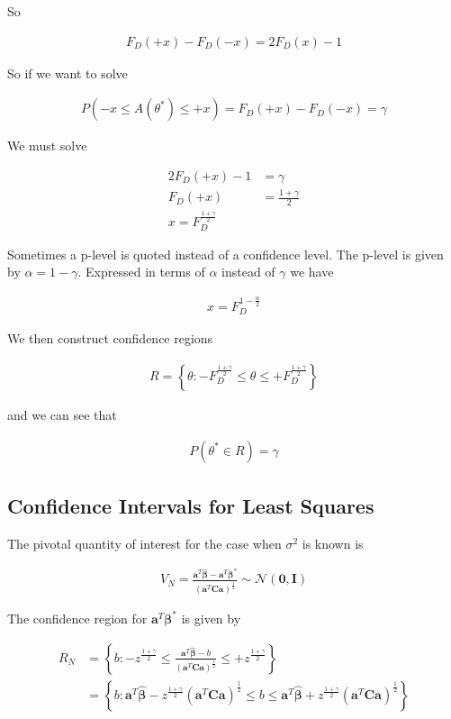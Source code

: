 \documentclass[12pt]{article}
\newcommand{\bv}[1]{\boldsymbol{#1}}
\begin{document}
So

\begin{align}
F_D(+x) - F_D(-x) = 2F_D(x) - 1
\end{align}

So if we want to solve

\begin{align}
P(-x \le A(\theta^*) \le +x) = F_D(+x) - F_D(-x) = \gamma
\end{align}

We must solve

\begin{align}
2F_D(+x) - 1 &= \gamma\\
F_D(+x) &= \frac{1+\gamma}{2}\\
x = F_D^{\frac{1+\gamma}{2}}
\end{align}

Sometimes a p-level is quoted instead of a confidence level.
The p-level is given by $\alpha=1-\gamma$. Expressed in terms of $\alpha$ instead of $\gamma$ we have

\begin{align}
x = F_D^{1-\frac{\alpha}{2}}
\end{align}

We then construct confidence regions

\begin{align}
R = \left\{\theta : -F_D^{\frac{1+\gamma}{2}} \le \theta \le +F_D^{\frac{1+\gamma}{2}}\right\}
\end{align}

and we can see that

\begin{align}
P(\theta^* \in R) = \gamma
\end{align}

\subsection{Confidence Intervals for Least Squares}
The pivotal quantity of interest for the case when $\sigma^2$ is known is

\begin{align}
V_N = \frac{\bv{a}^T\bv{\hat{\beta}} - \bv{a}^T\bv{\beta^*}}{(\bv{a}^T\bv{C}\bv{a})^{\frac{1}{2}}} \sim \mathcal{N}(\bv{0},\bv{I})
\end{align}

The confidence region for $\bv{a}^T\bv{\beta^*}$ is given by

\begin{align}
R_N &= \left\{b : -z^{\frac{1+\gamma}{2}} \le \frac{\bv{a}^T\bv{\hat{\beta}} - b}{(\bv{a}^T\bv{C}\bv{a})^{\frac{1}{2}}} \le +z^{\frac{1+\gamma}{2}}\right\}\\
&= \left\{b: \bv{a}^T\bv{\hat{\beta}} - z^{\frac{1+\gamma}{2}}(\bv{a}^T\bv{C}\bv{a})^{\frac{1}{2}} \le b \le \bv{a}^T\bv{\hat{\beta}} + z^{\frac{1+\gamma}{2}}(\bv{a}^T\bv{C}\bv{a})^{\frac{1}{2}} \right\}
\end{align}
\end{document}
